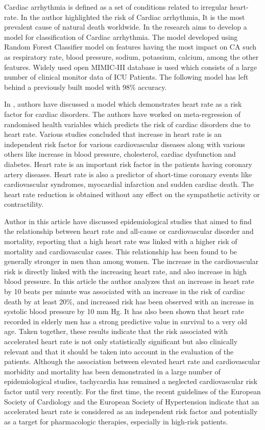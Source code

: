 \documentclass{article}
\begin{document}
Cardiac arrhythmia is defined as a set of conditions related to irregular heart-rate. In \cite{rt2} the author highlighted the risk of Cardiac arrhythmia, It is the most prevalent cause of natural death worldwide. In \cite{rt2} the research aims to develop a model for classification of Cardiac arrhythmia. The model developed using Random Forest Classifier model on features having the most impact on CA such as respiratory rate, blood pressure, sodium, potassium, calcium, among the other features. Widely used open MIMIC-III database is used which consists of a large number of clinical monitor data of ICU Patients. The following model has  left behind a previously built model with 98\% accuracy.

In \cite{rt6}, authors have discussed a model which demonstrates heart rate as a risk factor for cardiac disorders. The authors have worked on meta-regression of randomised health variables which predicts the risk of cardiac disorders due to heart rate. Various studies concluded that increase in heart rate is an independent risk factor for various cardiovascular diseases along with various others like increase in blood pressure, cholesterol, cardiac dysfunction and diabetes. Heart rate is an important risk factor in the patients having coronary artery diseases. Heart rate is also a predictor of short-time coronary events like cardiovascular syndromes, myocardial infarction and sudden cardiac death. The heart rate reduction is obtained without any effect on the sympathetic activity or contractility.

Author \cite{rt3} in this article have discussed epidemiological studies that aimed to find the relationship between heart rate and all-cause or cardiovascular disorder and mortality, reporting that a high heart rate was linked with a higher risk of mortality and cardiovascular cases. This relationship has been found to be generally stronger in men than among women. The increase in the cardiovascular risk is directly linked with the increasing heart rate, and also increase in high blood pressure. In this article the author analyzes that an increase in heart rate by 10 beats per minute was associated with an increase in the risk of cardiac death by at least 20\%, and increased risk has been observed with an increase in systolic blood pressure by 10 mm Hg. It has also been shown that heart rate recorded in elderly men has a strong predictive value in survival to a very old age. Taken together, these results indicate that the risk associated with accelerated heart rate is not only statistically significant but also clinically relevant and that it should be taken into account in the evaluation of the patients. Although the association between elevated heart rate and cardiovascular morbidity and mortality has been demonstrated in a large number of epidemiological studies, tachycardia has remained a neglected cardiovascular risk factor until very recently. For the first time, the recent guidelines of the European Society of Cardiology and the European Society of Hypertension indicate that an accelerated heart rate is considered as an independent risk factor and potentially as a target for pharmacologic therapies, especially in high-risk patients.
\end{document}
